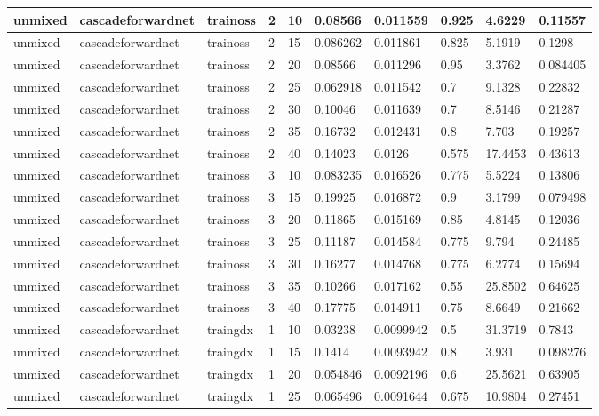 \begin{longtable}{lllllllll}
unmixed & cascadeforwardnet & trainoss & 2 & 10 & 0.08566 & 0.011559 & 0.925 & 4.6229 & 0.11557 \\ \hline 
unmixed & cascadeforwardnet & trainoss & 2 & 15 & 0.086262 & 0.011861 & 0.825 & 5.1919 & 0.1298 \\ \hline 
unmixed & cascadeforwardnet & trainoss & 2 & 20 & 0.08566 & 0.011296 & 0.95 & 3.3762 & 0.084405 \\ \hline 
unmixed & cascadeforwardnet & trainoss & 2 & 25 & 0.062918 & 0.011542 & 0.7 & 9.1328 & 0.22832 \\ \hline 
unmixed & cascadeforwardnet & trainoss & 2 & 30 & 0.10046 & 0.011639 & 0.7 & 8.5146 & 0.21287 \\ \hline 
unmixed & cascadeforwardnet & trainoss & 2 & 35 & 0.16732 & 0.012431 & 0.8 & 7.703 & 0.19257 \\ \hline 
unmixed & cascadeforwardnet & trainoss & 2 & 40 & 0.14023 & 0.0126 & 0.575 & 17.4453 & 0.43613 \\ \hline 
unmixed & cascadeforwardnet & trainoss & 3 & 10 & 0.083235 & 0.016526 & 0.775 & 5.5224 & 0.13806 \\ \hline 
unmixed & cascadeforwardnet & trainoss & 3 & 15 & 0.19925 & 0.016872 & 0.9 & 3.1799 & 0.079498 \\ \hline 
unmixed & cascadeforwardnet & trainoss & 3 & 20 & 0.11865 & 0.015169 & 0.85 & 4.8145 & 0.12036 \\ \hline 
unmixed & cascadeforwardnet & trainoss & 3 & 25 & 0.11187 & 0.014584 & 0.775 & 9.794 & 0.24485 \\ \hline 
unmixed & cascadeforwardnet & trainoss & 3 & 30 & 0.16277 & 0.014768 & 0.775 & 6.2774 & 0.15694 \\ \hline 
unmixed & cascadeforwardnet & trainoss & 3 & 35 & 0.10266 & 0.017162 & 0.55 & 25.8502 & 0.64625 \\ \hline 
unmixed & cascadeforwardnet & trainoss & 3 & 40 & 0.17775 & 0.014911 & 0.75 & 8.6649 & 0.21662 \\ \hline 
unmixed & cascadeforwardnet & traingdx & 1 & 10 & 0.03238 & 0.0099942 & 0.5 & 31.3719 & 0.7843 \\ \hline 
unmixed & cascadeforwardnet & traingdx & 1 & 15 & 0.1414 & 0.0093942 & 0.8 & 3.931 & 0.098276 \\ \hline 
unmixed & cascadeforwardnet & traingdx & 1 & 20 & 0.054846 & 0.0092196 & 0.6 & 25.5621 & 0.63905 \\ \hline 
unmixed & cascadeforwardnet & traingdx & 1 & 25 & 0.065496 & 0.0091644 & 0.675 & 10.9804 & 0.27451 \\ \hline 

\end{longtable}
